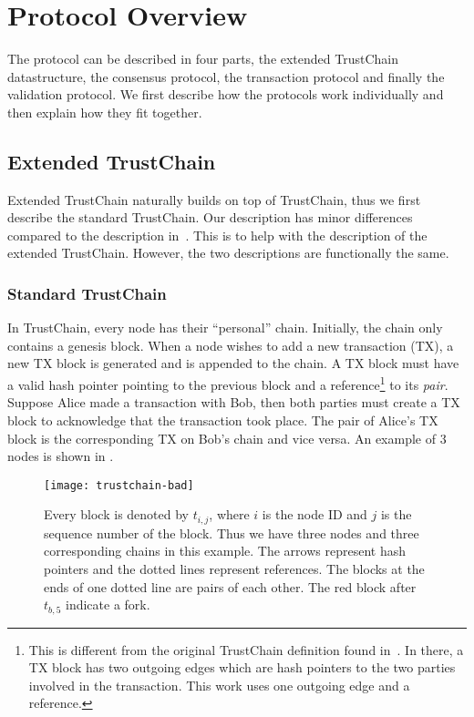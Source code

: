 \section{Protocol Overview}
\label{sec:protocol-overview}
The protocol can be described in four parts, the extended TrustChain datastructure, 
the consensus protocol, the transaction protocol and finally the validation protocol.
We first describe how the protocols work individually and then explain how they fit together.

\subsection{Extended TrustChain}
Extended TrustChain naturally builds on top of TrustChain, thus we first describe the standard TrustChain.
Our description has minor differences compared to the description in~\cite{trustchain}.
This is to help with the description of the extended TrustChain.
However, the two descriptions are functionally the same.

\subsubsection*{Standard TrustChain}
In TrustChain, every node has their ``personal'' chain. 
Initially, the chain only contains a genesis block.
When a node wishes to add a new transaction (TX), a new TX block is generated and is appended to the chain.
A TX block must have a valid hash pointer pointing to the previous block
and a reference\footnote{This is different from the original TrustChain definition found in~\cite{trustchain}.
In there, a TX block has two outgoing edges which are hash pointers to the two parties involved in the transaction.
This work uses one outgoing edge and a reference.} to its \emph{pair}.
Suppose Alice made a transaction with Bob, then both parties must create a TX block to acknowledge that the transaction took place.
The pair of Alice's TX block is the corresponding TX on Bob's chain and vice versa.
An example of 3 nodes is shown in .

\begin{figure}
    \texttt{[image: trustchain-bad]}
    \centering
    \caption{Every block is denoted by $t_{i,j}$, where $i$ is the node ID and $j$ is the sequence number of the block.
    Thus we have three nodes and three corresponding chains in this example.
    The arrows represent hash pointers and the dotted lines represent references.
    The blocks at the ends of one dotted line are pairs of each other.
    The red block after $t_{b, 5}$ indicate a fork.}
    \label{fig:trustchain-bad}
\end{figure}

